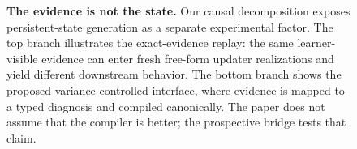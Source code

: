 \begin{figure}[t]
{%
}
\caption{\textbf{The evidence is not the state.} Our causal decomposition exposes persistent-state generation as a separate experimental factor. The top branch illustrates the exact-evidence replay: the same learner-visible evidence can enter fresh free-form updater realizations and yield different downstream behavior. The bottom branch shows the proposed variance-controlled interface, where evidence is mapped to a typed diagnosis and compiled canonically. The paper does not assume that the compiler is better; the prospective bridge tests that claim.}
\label{fig:state-generation}
\end{figure}
